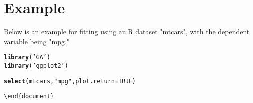 \documentclass{article}\usepackage[]{graphicx}\usepackage[]{color}
\makeatletter
\newcommand{\hlstr}[1]{\textcolor[rgb]{0.192,0.494,0.8}{#1}}%
\newcommand{\hlkwd}[1]{\textcolor[rgb]{0.737,0.353,0.396}{\textbf{#1}}}%
\newenvironment{kframe}{%
 \def\at@end@of@kframe{}%
 \ifinner\ifhmode%
  \def\at@end@of@kframe{\end{minipage}}%
  \begin{minipage}{\columnwidth}%
 \fi\fi%
 \def\FrameCommand##1{\hskip\@totalleftmargin \hskip-\fboxsep
 \colorbox{shadecolor}{##1}\hskip-\fboxsep
     \hskip-\linewidth \hskip-\@totalleftmargin \hskip\columnwidth}%
 \MakeFramed {\advance\hsize-\width
   \@totalleftmargin\z@ \linewidth\hsize
   \@setminipage}}%
 {\par\unskip\endMakeFramed%
 \at@end@of@kframe}
\newenvironment{knitrout}{}{} %
\makeatother
\begin{document}
\section{Example}
Below is an example for fitting using an R dataset "mtcars", with the dependent variable being "mpg."

\begin{knitrout}
\color{fgcolor}\begin{kframe}
\begin{alltt}

\hlkwd{library}(\hlstr{'GA'})
\hlkwd{library}(\hlstr{'ggplot2'})

\hlkwd{select}(mtcars, \hlstr{"mpg"}, plot.return = TRUE)

\textbackslash{}end\{document\}
\end{alltt}


{\ttfamily\noindent\bfseries{}}\end{kframe}
\end{knitrout}
\end{document}
